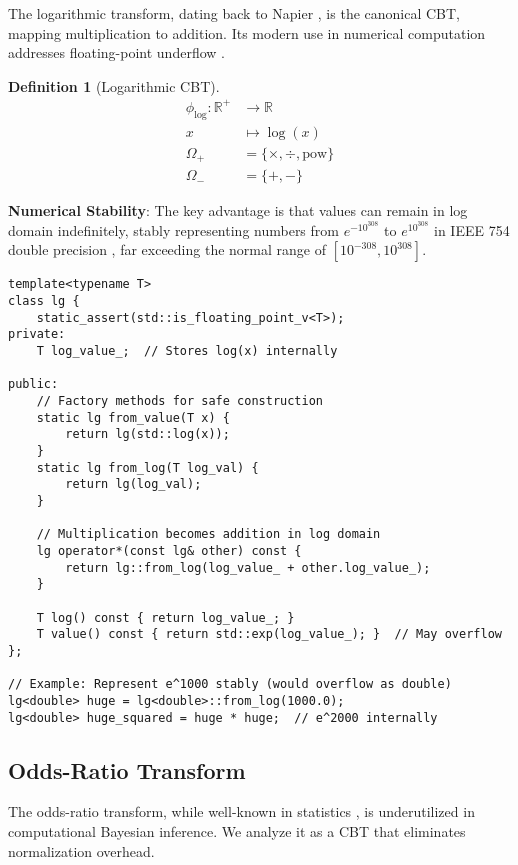 \documentclass[11pt]{article}
\theoremstyle{definition}
\newtheorem{definition}{Definition}
\begin{document}
The logarithmic transform, dating back to Napier \cite{napier1614mirifici}, is the canonical CBT, mapping multiplication to addition. Its modern use in numerical computation addresses floating-point underflow \cite{goldberg1991every}.

\begin{definition}[Logarithmic CBT]
\begin{align}
\phi_{\log}: \mathbb{R}^+ &\to \mathbb{R} \\
x &\mapsto \log(x) \\
\Omega_+ &= \{\times, \div, \text{pow}\} \\
\Omega_- &= \{+, -\}
\end{align}
\end{definition}

\textbf{Numerical Stability}: The key advantage is that values can remain in log domain indefinitely, stably representing numbers from $e^{-10^{308}}$ to $e^{10^{308}}$ in IEEE 754 double precision \cite{ieee754}, far exceeding the normal range of $[10^{-308}, 10^{308}]$.

\begin{lstlisting}[caption={Extended range in logarithmic domain}]
template<typename T>
class lg {
    static_assert(std::is_floating_point_v<T>);
private:
    T log_value_;  // Stores log(x) internally
    
public:
    // Factory methods for safe construction
    static lg from_value(T x) { 
        return lg(std::log(x)); 
    }
    static lg from_log(T log_val) { 
        return lg(log_val); 
    }
    
    // Multiplication becomes addition in log domain
    lg operator*(const lg& other) const {
        return lg::from_log(log_value_ + other.log_value_);
    }
    
    T log() const { return log_value_; }
    T value() const { return std::exp(log_value_); }  // May overflow
};

// Example: Represent e^1000 stably (would overflow as double)
lg<double> huge = lg<double>::from_log(1000.0);
lg<double> huge_squared = huge * huge;  // e^2000 internally
\end{lstlisting}

\subsection{Odds-Ratio Transform}

The odds-ratio transform, while well-known in statistics \cite{agresti2003categorical}, is underutilized in computational Bayesian inference. We analyze it as a CBT that eliminates normalization overhead.
\end{document}
